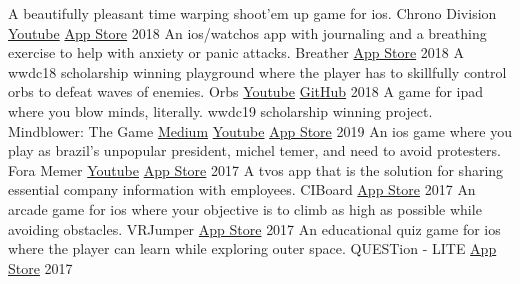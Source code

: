 

\begin{cventries}
  \cvcompactentry
    {A beautifully pleasant time warping shoot'em up game for ios.}
    {Chrono Division}
    {\href{https://www.youtube.com/watch?v=Wc9-ALdmvRw}{Youtube} \hspace{4pt} \href{https://itunes.apple.com/app/id1437675179}{App Store}}
    {2018}
  \cvcompactentry
    {An ios/watchos app with journaling and a breathing exercise to help with anxiety or panic attacks.}
    {Breather}
    {\href{https://itunes.apple.com/app/id1370659046}{App Store}}
    {2018}
  \cvcompactentry
    {A wwdc18 scholarship winning playground where the player has to skillfully control orbs to defeat waves of enemies.}
    {Orbs}
    {\href{https://www.youtube.com/watch?v=W-tzS0x1SiA}{Youtube} \hspace{4pt} \href{https://github.com/renanmagagnin/orbs-wwdc18}{GitHub}}
    {2018}
  \cvcompactentry
    {A game for ipad where you blow minds, literally. wwdc19 scholarship winning project.}
    {Mindblower: The Game}
    {\href{https://medium.freecodecamp.org/how-i-won-a-scholarship-to-apples-yearly-event-for-the-second-time-f04f5f4636b1}{Medium} \hspace{4pt} \href{https://www.youtube.com/watch?v=xH9cn7BtG8k}{Youtube} \hspace{4pt} \href{https://itunes.apple.com/us/app/mindblower-the-game/id1460079689}{App Store}} %
    {2019}
  \cvcompactentry
    {An ios game where you play as brazil's unpopular president, michel temer, and need to avoid protesters.}
    {Fora Memer}
    {\href{https://youtu.be/YwVg7Yuu3pY}{Youtube} \hspace{4pt} \href{https://itunes.apple.com/br/app/fora-memer/id1253655537}{App Store}}
    {2017}
  \cvcompactentry
    {A tvos app that is the solution for sharing essential company information with employees.}
    {CIBoard}
    {\href{https://itunes.apple.com/app/id1293364926}{App Store}}
    {2017}
  \cvcompactentry
    {An arcade game for ios where your objective is to climb as high as possible while avoiding obstacles.}
    {VRJumper}
    {\href{https://itunes.apple.com/app/id1262625055}{App Store}}
    {2017}
  \cvcompactentry
    {An educational quiz game for ios where the player can learn while exploring outer space.}
    {QUESTion - LITE}
    {\href{https://itunes.apple.com/app/id1233411790}{App Store}}
    {2017}
\end{cventries}

